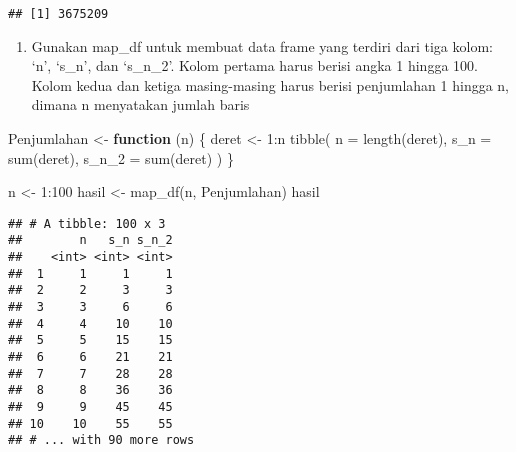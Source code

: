 \documentclass[
]{article}
\newenvironment{Shaded}{\begin{snugshade}}{\end{snugshade}}
\newcommand{\AttributeTok}[1]{\textcolor[rgb]{0.77,0.63,0.00}{#1}}
\newcommand{\ControlFlowTok}[1]{\textcolor[rgb]{0.13,0.29,0.53}{\textbf{#1}}}
\newcommand{\DecValTok}[1]{\textcolor[rgb]{0.00,0.00,0.81}{#1}}
\newcommand{\FunctionTok}[1]{\textcolor[rgb]{0.00,0.00,0.00}{#1}}
\newcommand{\NormalTok}[1]{#1}
\newcommand{\OtherTok}[1]{\textcolor[rgb]{0.56,0.35,0.01}{#1}}
\newcommand{\SpecialCharTok}[1]{\textcolor[rgb]{0.00,0.00,0.00}{#1}}
\providecommand{\tightlist}{%
  \setlength{\itemsep}{0pt}\setlength{\parskip}{0pt}}
\begin{document}
\begin{verbatim}
## [1] 3675209
\end{verbatim}

\begin{enumerate}
\def\labelenumi{\arabic{enumi}.}
\setcounter{enumi}{3}
\tightlist
\item
  Gunakan map\_df untuk membuat data frame yang terdiri dari tiga kolom:
  `n', `s\_n', dan `s\_n\_2'. Kolom pertama harus berisi angka 1 hingga
  100. Kolom kedua dan ketiga masing-masing harus berisi penjumlahan 1
  hingga n, dimana n menyatakan jumlah baris
\end{enumerate}

\begin{Shaded}
\begin{Highlighting}[]
\NormalTok{Penjumlahan }\OtherTok{\textless{}{-}} \ControlFlowTok{function}\NormalTok{ (n) \{}
\NormalTok{  deret }\OtherTok{\textless{}{-}} \DecValTok{1}\SpecialCharTok{:}\NormalTok{n}
  \FunctionTok{tibble}\NormalTok{(}
  \AttributeTok{n =} \FunctionTok{length}\NormalTok{(deret),}
  \AttributeTok{s\_n =} \FunctionTok{sum}\NormalTok{(deret),}
  \AttributeTok{s\_n\_2 =} \FunctionTok{sum}\NormalTok{(deret)}
\NormalTok{ )}
\NormalTok{\}}

\NormalTok{n }\OtherTok{\textless{}{-}} \DecValTok{1}\SpecialCharTok{:}\DecValTok{100}
\NormalTok{hasil }\OtherTok{\textless{}{-}} \FunctionTok{map\_df}\NormalTok{(n, Penjumlahan)}
\NormalTok{hasil}
\end{Highlighting}
\end{Shaded}

\begin{verbatim}
## # A tibble: 100 x 3
##        n   s_n s_n_2
##    <int> <int> <int>
##  1     1     1     1
##  2     2     3     3
##  3     3     6     6
##  4     4    10    10
##  5     5    15    15
##  6     6    21    21
##  7     7    28    28
##  8     8    36    36
##  9     9    45    45
## 10    10    55    55
## # ... with 90 more rows
\end{verbatim}
\end{document}
